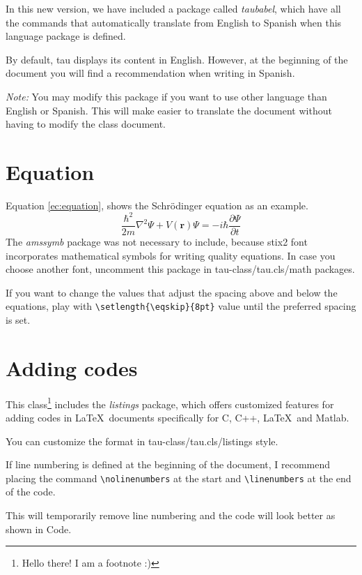 \documentclass[9pt,a4paper,twoside]{tau-class/tau}
\begin{document}
        In this new version, we have included a package called \textit{taubabel}, which have all the commands that automatically translate from English to Spanish when this language package is defined. 
        
        By default, tau displays its content in English. However, at the beginning of the document you will find a recommendation when writing in Spanish. 
		
        \textit{Note:} You may modify this package if you want to use other language than English or Spanish. This will make easier to translate the document without having to modify the class document.
		
\section{Equation}

    Equation \ref{ec:equation}, shows the Schrödinger equation as an example. 
	\begin{equation} \label{ec:equation}
		\frac{\hbar^2}{2m}\nabla^2\Psi + V(\mathbf{r})\Psi = -i\hbar \frac{\partial\Psi}{\partial t}
	\end{equation} 
    The \textit{amssymb} package was not necessary to include, because stix2 font incorporates mathematical symbols for writing quality equations. In case you choose another font, uncomment this package in tau-class/tau.cls/math packages.
	
    If you want to change the values that adjust the spacing above and below the equations, play with \verb|\setlength{\eqskip}{8pt}| value until the preferred spacing is set.
	
\section{Adding codes}
	
    This class\footnote{Hello there! I am a footnote :)} includes the \textit{listings} package, which offers customized features for adding codes in \LaTeX\ documents specifically for C, C++, \LaTeX\ and Matlab. 
	
    You can customize the format in tau-class/tau.cls/listings style.
	
    If line numbering is defined at the beginning of the document, I recommend placing the command \verb|\nolinenumbers| at the start and \verb|\linenumbers| at the end of the code. 
	
    This will temporarily remove line numbering and the code will look better as shown in Code.
	
\end{document}

